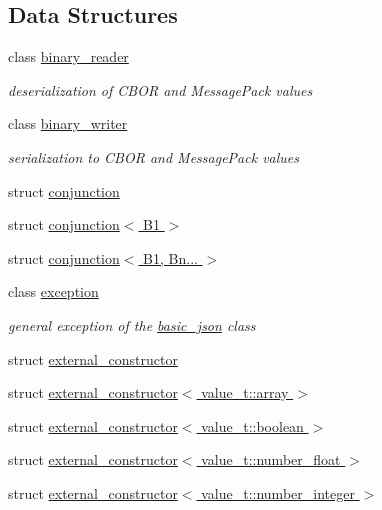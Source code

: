 \subsection*{Data Structures}
\begin{DoxyCompactItemize}
\item 
class \hyperlink{classnlohmann_1_1detail_1_1binary__reader}{binary\+\_\+reader}
\begin{DoxyCompactList}\small\item\em deserialization of C\+B\+OR and Message\+Pack values \end{DoxyCompactList}\item 
class \hyperlink{classnlohmann_1_1detail_1_1binary__writer}{binary\+\_\+writer}
\begin{DoxyCompactList}\small\item\em serialization to C\+B\+OR and Message\+Pack values \end{DoxyCompactList}\item 
struct \hyperlink{structnlohmann_1_1detail_1_1conjunction}{conjunction}
\item 
struct \hyperlink{structnlohmann_1_1detail_1_1conjunction_3_01_b1_01_4}{conjunction$<$ B1 $>$}
\item 
struct \hyperlink{structnlohmann_1_1detail_1_1conjunction_3_01_b1_00_01_bn_8_8_8_01_4}{conjunction$<$ B1, Bn... $>$}
\item 
class \hyperlink{classnlohmann_1_1detail_1_1exception}{exception}
\begin{DoxyCompactList}\small\item\em general exception of the \hyperlink{classnlohmann_1_1basic__json}{basic\+\_\+json} class \end{DoxyCompactList}\item 
struct \hyperlink{structnlohmann_1_1detail_1_1external__constructor}{external\+\_\+constructor}
\item 
struct \hyperlink{structnlohmann_1_1detail_1_1external__constructor_3_01value__t_1_1array_01_4}{external\+\_\+constructor$<$ value\+\_\+t\+::array $>$}
\item 
struct \hyperlink{structnlohmann_1_1detail_1_1external__constructor_3_01value__t_1_1boolean_01_4}{external\+\_\+constructor$<$ value\+\_\+t\+::boolean $>$}
\item 
struct \hyperlink{structnlohmann_1_1detail_1_1external__constructor_3_01value__t_1_1number__float_01_4}{external\+\_\+constructor$<$ value\+\_\+t\+::number\+\_\+float $>$}
\item 
struct \hyperlink{structnlohmann_1_1detail_1_1external__constructor_3_01value__t_1_1number__integer_01_4}{external\+\_\+constructor$<$ value\+\_\+t\+::number\+\_\+integer $>$}

\end{DoxyCompactItemize}
